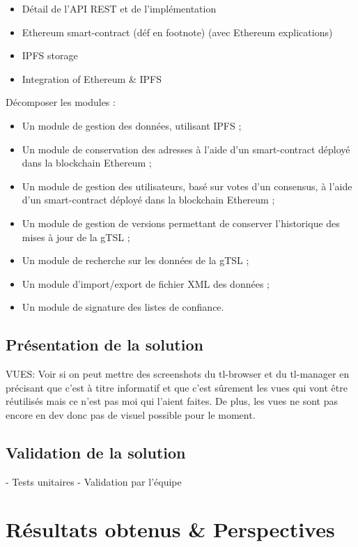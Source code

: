 \documentclass{tnreport}
\begin{document}
\begin{itemize}
	\item Détail de l'API REST et de l'implémentation
	\item Ethereum smart-contract (déf en footnote) (avec Ethereum explications)
	\item IPFS storage
	\item Integration of Ethereum \& IPFS
\end{itemize}

Décomposer les modules :
\begin{itemize}
	\item Un module de gestion des données, utilisant IPFS ;
	\item Un module de conservation des adresses à l’aide d’un smart-contract déployé dans la blockchain Ethereum ;
	\item Un module de gestion des utilisateurs, basé sur votes d’un consensus, à l’aide d’un smart-contract déployé dans la blockchain Ethereum ;
	\item Un module de gestion de versions permettant de conserver l’historique des mises à jour de la gTSL ;
	\item Un module de recherche sur les données de la gTSL ;
	\item Un module d’import/export de fichier XML des données ;
	\item Un module de signature des listes de confiance.
\end{itemize}

\section{Présentation de la solution}

VUES:
Voir si on peut mettre des screenshots du tl-browser et du tl-manager en précisant que c'est à titre informatif et que c'est sûrement les vues qui vont être réutilisés mais ce n'est pas moi qui l'aient faites. De plus, les vues ne sont pas encore en dev donc pas de visuel possible pour le moment.

\section{Validation de la solution}

- Tests unitaires
- Validation par l'équipe

\chapter{Résultats obtenus \& Perspectives}
\end{document}
